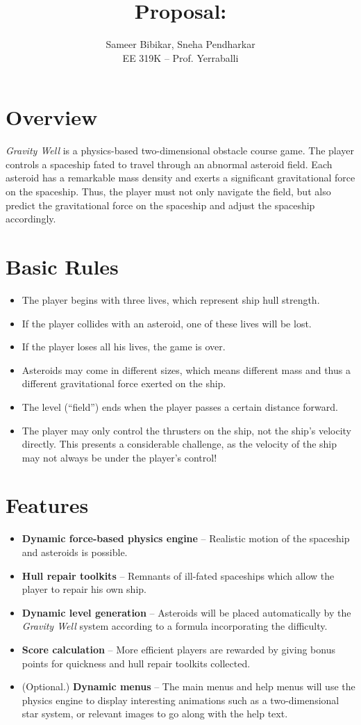 \documentclass{article}
\title{Proposal: \gameti}
\author{Sameer Bibikar, Sneha Pendharkar\\
EE 319K -- Prof. Yerraballi}
\def\gamename{Gravity Well}
\def\gameti{\textit{\gamename } }
\begin{document}
\maketitle
\section{Overview}
\gameti  is a physics-based two-dimensional obstacle course game.
The player controls a spaceship fated to travel through an abnormal asteroid field.
Each asteroid has a remarkable mass density and exerts a significant
gravitational force on the spaceship. Thus, the player must not only navigate the field,
but also predict the gravitational force on the spaceship and adjust the spaceship accordingly.
\section{Basic Rules}
\begin{itemize}
	\item The player begins with three lives, which represent ship hull strength.
	\item If the player collides with an asteroid, one of these lives will be lost.
	\item If the player loses all his lives, the game is over.
	\item Asteroids may come in different sizes, which means different mass and thus
		a different gravitational force exerted on the ship.
	\item The level (``field'') ends when the player passes a certain distance forward.
	\item The player may only control the thrusters on the ship, not the ship's velocity
		directly. This presents a considerable challenge, as the velocity of the
		ship may not always be under the player's control!
\end{itemize}
\section{Features}
\begin{itemize}
	\item \textbf{Dynamic force-based physics engine} -- Realistic motion of the spaceship and asteroids
		is possible.
	\item \textbf{Hull repair toolkits} -- Remnants of ill-fated spaceships which allow 
		the player to repair his own ship.
	\item \textbf{Dynamic level generation} -- Asteroids will be placed automatically by
		the \gameti  system according to a formula incorporating the difficulty.
	\item \textbf{Score calculation} -- More efficient players are rewarded by giving
		bonus points for quickness and hull repair toolkits collected.
	\item (Optional.) \textbf{Dynamic menus} -- The main menus and help menus will use the
		physics engine to display interesting animations such as a two-dimensional
		star system, or relevant images to go along with the help text.
\end{itemize}
\end{document}
